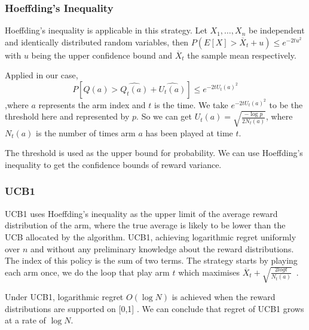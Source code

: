     \subsubsection{Hoeffding’s Inequality}
    Hoeffding's inequality is applicable in this strategy.
    Let $X_1, \dots, X_n$ be independent and identically distributed random variables, then $ P(E[X] > \overline  X_t + u) \leq e^{-2t u^2}$ with $u$ being the upper confidence bound and $ \overline X_t $ the sample mean respectively. \citep{Hoeffding1963}
    \par
    Applied in our case, 
    $$P[Q(a) >\widehat{Q_t (a)}+\widehat{U_t (a)}] \leq e^{-2t U_t(a)^2}$$
    ,where $a$ represents the arm index and $t$ is the time. We take $e^{-2t U_t(a)^2} $ to be the threshold here and represented by $p$.
    So we can get $U_t(a) = \sqrt{\frac{-\log p}{2N_t (a)}}$, where $N_t (a)$ is the number of times arm $a$ has been played at time $t$.
    \par
    The threshold is used as the upper bound for probability.
    We can use Hoeffding's inequality to get the confidence bounds of reward variance.

    \subsubsection{UCB1}
    UCB1 uses Hoeffding's inequality as the upper limit of the average reward distribution of the arm, where the true average is likely to be lower than the UCB allocated by the algorithm.
    UCB1, achieving logarithmic regret uniformly over $n$ and without any preliminary knowledge about the reward distributions. The index of this policy is the sum of two terms.
    The strategy starts by playing each arm once, we do the loop that play arm $t$ which maximises $\overline X_t + \sqrt{\frac{2log t}{N_t (a)}}$~\citep{Auer2002}.
    \par
    Under UCB1, logarithmic regret $O(\log N)$  is achieved when the reward distributions are supported on [0,1] \citep{Chan_2020}.
    We can conclude that regret of UCB1 grows at a rate of $\log N$.
    \par
